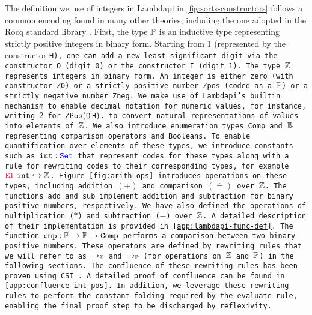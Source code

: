The definition we use of integers in Lambdapi in \cref{fig:sorts-constructors} follows a common encoding found in many other theories, including the one adopted in the Rocq standard library \cite{Rocq-refman}.
First, the type $\mathbb{P}$  is an inductive type representing strictly positive integers in binary form.
Starting from 1 (represented by the constructor \tt{H}), one can add a new least significant digit via the constructor \tt{O} (digit 0) or the constructor \tt{I} (digit 1). 
The type $\mathbb{Z}$ represents integers in binary form.
An integer is either zero (with constructor \tt{Z0}) or a strictly positive number \tt{Zpos} (coded as a $\mathbb{P}$) or a strictly negative number \tt{Zneg}.
We make use of Lambdapi's \lstinline[language=Lambdapi,basicstyle=\ttfamily\footnotesize]|builtin| mechanism to enable decimal notation for numeric values, for instance, writing $2$ for $\mathop{\texttt{ZPos}} (\mathop{\texttt{O}} \texttt{H})$.
to convert natural representations of values into elements of $\mathbb{Z}$.
%
We also introduce enumeration types \tt{Comp} and $\mathbb{B}$ representing comparison operators and Booleans. 
%
To enable quantification over elements of these types, we introduce constants such as $\texttt{int}: \textcolor{blue}{\texttt{\upshape{Set}}}$ that represent codes for these types along with a rule for rewriting codes to their corresponding types, for example $\textcolor{purple}{\mathop{\texttt{\upshape{El}}}}~\texttt{int} \hookrightarrow \mathbb{Z}$.
Figure~\ref{fig:arith-ops} introduces operations on these types, including addition $(+)$ and comparison $(\doteq)$ over $\mathbb{Z}$. The functions \texttt{add} and \texttt{sub} implement addition and subtraction for binary positive numbers, respectively.
We have also defined the operations of multiplication ($\mathbin{*}$) and subtraction ($\mathbin{-}$) over $\mathbb{Z}$. A detailed description of their implementation is provided in \cref{app:lambdapi-func-def}.
The function $\texttt{cmp}: \mathbb{P} \to \mathbb{P} \to \texttt{Comp}$ performs a comparison between two binary positive numbers. 
These operators are defined by rewriting rules that we will refer to as $\rightarrow_\mathbb{Z}$ and $\rightarrow_\mathbb{P}$ (for operations on $\mathbb{Z}$ and $\mathbb{P}$) in the following sections.
The confluence of these rewriting rules has been proven using CSI \cite{CSI}. A detailed proof of confluence can be found in \cref{app:confluence-int-pos}.
In addition, we leverage these rewriting rules to perform the constant folding required by the \texttt{evaluate} rule, enabling the final proof step to be discharged by reflexivity.

